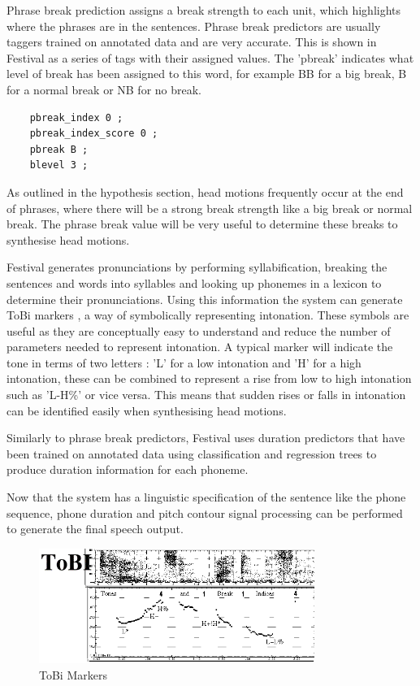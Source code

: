 \documentclass[bsc,frontabs,twoside,singlespacing,parskip]{infthesis}
\begin{document}
Phrase break prediction assigns a break strength to each unit, which highlights where the phrases are in the sentences. Phrase break predictors are usually taggers trained on annotated data and are very accurate. This is shown in Festival as a series of tags with their assigned values. The 'pbreak' indicates what level of break has been assigned to this word, for example BB for a big break, B for a normal break or NB for no break.

\begin{lstlisting}
	pbreak_index 0 ;
	pbreak_index_score 0 ;
	pbreak B ; 
	blevel 3 ; 
\end{lstlisting}

As outlined in the hypothesis section, head motions frequently occur at the end of phrases, where there will be a strong break strength like a big break or normal break. The phrase break value will be very useful to determine these breaks to synthesise head motions.

Festival generates pronunciations by performing syllabification, breaking the sentences and words into syllables and looking up phonemes in a lexicon to determine their pronunciations. Using this information the system can generate ToBi markers \cite{tobi}, a way of symbolically representing intonation. These symbols are useful as they are conceptually easy to understand and reduce the number of parameters needed to represent intonation. A typical marker will indicate the tone in terms of two letters : 'L' for a low intonation and 'H' for a high intonation, these can be combined to represent a rise from low to high intonation such as 'L-H\%' or vice versa.  This means that sudden rises or falls in intonation can be identified easily when synthesising head motions. 

Similarly to phrase break predictors, Festival uses duration predictors that have been trained on annotated data using classification and regression trees to produce duration information for each phoneme.

Now that the system has a linguistic specification of the sentence like the phone sequence, phone duration and pitch contour signal processing can be performed to generate the final speech output.

\begin{figure}[h!]
	\centering
	\includegraphics[width=0.8\textwidth]{tobi.png}
	\caption{ToBi Markers}
\end{figure}
\end{document}

